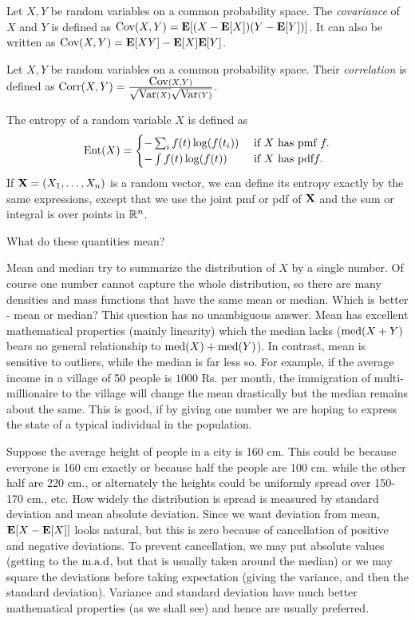 \documentclass[preprint,  11pt]{amsart}
\def\X{{\bf X}}
\begin{document}
 Let $X,Y$ be random variables on a common probability space. The {\em covariance} of $X$ and $Y$ is defined as $\mbox{Cov}(X,Y)=\mathbf{E}[(X-\mathbf{E}[X])(Y-\mathbf{E}[Y])]$. It can also be written as $\mbox{Cov}(X,Y)=\mathbf{E}[XY]-\mathbf{E}[X]\mathbf{E}[Y]$.

 Let $X,Y$ be random variables on a common probability space. Their {\em correlation} is defined as $\mbox{Corr}(X,Y)=\frac{\mbox{Cov}(X,Y)}{\sqrt{\mbox{Var}(X)}\sqrt{\mbox{Var}(Y)}}$.

 The entropy of a random variable $X$ is defined as
$$
\mbox{Ent}(X) = \begin{cases} -\sum_{i} f(t) \log(f(t_{i})) & \mbox{ if }X\mbox{ has pmf }f.\\
-\int\limits f(t) \log(f(t)) & \mbox{ if }X \mbox{ has pdf} f. \end{cases}
$$
If $\X=(X_{1},\ldots ,X_{n})$ is a random vector, we can define its entropy exactly by the same expressions, except that we use the joint pmf or pdf of $\X$ and the sum or integral is over points in $\mathbb{R}^{n}$.




 What do these quantities mean?

 Mean and median  try to summarize the distribution of $X$ by a single number. Of course one number cannot capture the whole distribution, so there are many densities and mass functions that have the same mean or median. Which is better - mean or median? This question has no unambiguous answer. Mean has excellent mathematical properties (mainly linearity) which the median lacks ($\mbox{med}(X+Y)$ bears no general relationship to $\mbox{med}(X)+\mbox{med}(Y)$). In contrast, mean is sensitive to outliers, while the median is far less so. For example, if the average income in a village of 50 people is $1000$ Rs. per month, the immigration of multi-millionaire to the village will change the mean drastically but the median remains about the same. This is good, if by giving one number we are hoping to express the state of a typical individual in the population.

 Suppose the average height of people in a city is 160 cm. This could be because everyone is 160 cm exactly or because half the people are 100 cm. while the other half are 220 cm., or alternately the heights could be uniformly spread over 150-170 cm., etc. How widely the distribution is  spread is measured by standard deviation and mean absolute deviation. Since we want deviation from mean, $\mathbf{E}[X-\mathbf{E}[X]]$ looks natural, but this is zero because of cancellation of positive and negative deviations. To prevent cancellation, we may put absolute values (getting to the $\mbox{m.a.d}$, but that is usually taken around the median) or we may square the deviations before taking expectation (giving the variance, and then the standard deviation). Variance and standard deviation have much better mathematical properties (as we shall see) and hence are usually preferred.
\end{document}
